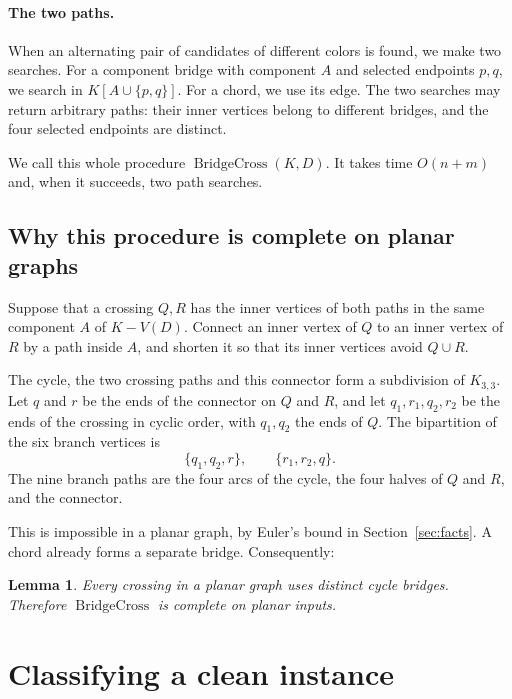 \documentclass[11pt]{article}
\newtheorem{lemma}{Lemma}
\DeclareMathOperator{\BridgeCross}{BridgeCross}
\begin{document}
\paragraph{The two paths.}
When an alternating pair of candidates of different colors is found, we make
two searches. For a component bridge with component $A$ and selected endpoints
$p,q$, we search in $K[A\cup\{p,q\}]$. For a chord, we use its edge. The two
searches may return arbitrary paths: their inner vertices belong to different
bridges, and the four selected endpoints are distinct.

We call this whole procedure $\BridgeCross(K,D)$. It takes time $O(n+m)$ and,
when it succeeds, two path searches.

\subsection{Why this procedure is complete on planar graphs}\label{sec:lemma4}

Suppose that a crossing $Q,R$ has the inner vertices of both paths in the same
component $A$ of $K-V(D)$. Connect an inner vertex of $Q$ to an inner vertex of
$R$ by a path inside $A$, and shorten it so that its inner vertices avoid
$Q\cup R$.

The cycle, the two crossing paths and this connector form a subdivision of
$K_{3,3}$. Let $q$ and $r$ be the ends of the connector on $Q$ and $R$, and let
$q_1,r_1,q_2,r_2$ be the ends of the crossing in cyclic order, with $q_1,q_2$
the ends of $Q$. The bipartition of the six branch vertices is
\begin{equation*}
\{q_1,q_2,r\},
\qquad
\{r_1,r_2,q\}.
\end{equation*}
The nine branch paths are the four arcs of the cycle, the four halves of $Q$
and $R$, and the connector.

This is impossible in a planar graph, by Euler's bound in
Section~\ref{sec:facts}. A chord already forms a separate bridge.
Consequently:

\begin{lemma}\label{lem:planar}
Every crossing in a planar graph uses distinct cycle bridges. Therefore
$\BridgeCross$ is complete on planar inputs.
\end{lemma}

\section{Classifying a clean instance}\label{sec:classify}
\end{document}
